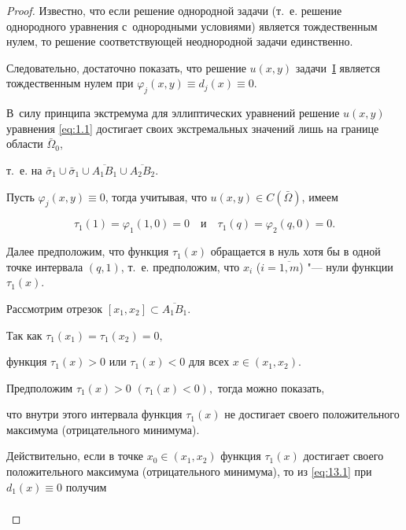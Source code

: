 \begin{proof}

Известно, что если решение однородной задачи  (т.~е. решение однородного уравнения с~однородными условиями) является тождественным нулем, то решение соответствующей неоднородной задачи единственно.   

Следовательно, достаточно показать, что решение $u(x,y)$ задачи~\hyperlink{abd:taskI}{\rm I}   является тождественным нулем при ${\varphi _j}(x, y) \equiv {d_j}(x) \equiv 0$.



В~силу принципа экстремума для эллиптических уравнений решение $u(x,y)$ уравнения \eqref{eq:1.1} достигает своих экстремальных значений лишь на границе области ${\bar \Omega _0}$, 

т.~е. на ${\bar \sigma _1} \cup {\bar \sigma _1} \cup \overline {{A_1}{B_1}}  \cup \overline {{A_2}{B_2}} $.



 Пусть ${\varphi _j}(x,y) \equiv 0$, тогда учитывая, что $u(x,y) \in C(\bar \Omega )$,  имеем 

 $${\tau _1}(1) = {\varphi _1}(1, 0) =  0 \quad \text{и}\quad {\tau _1}(q) = {\varphi _2}(q, 0) = 0.$$ 

Далее предположим, что функция ${\tau _1}(x)$  обращается в нуль хотя бы в одной точке интервала $(q, 1)$, т.~е. предположим, что  ${x_i}$ ($i = \overline {1, m} $) "--- нули функции~${\tau _1}(x)$.



Рассмотрим отрезок $[ {x_1}, {x_2}] \subset \overline {{A_1}{B_1}}$. 

Так как ${\tau _1}({x_1}) = {\tau _1}( {x_2}) = 0,$ 

функция ${\tau _1}( x ) > 0$ или ${\tau _1}( x) < 0$ для всех $x \in ( x_1 , x_2)$. 



Предположим ${\tau _1}\left( x \right) > 0$ $\left( {{\tau _1}\left( x \right) < 0} \right),$ тогда можно показать, 

что внутри  этого интервала функция ${\tau _1}(x)$ не достигает своего положительного максимума (отрицательного минимума).

Действительно, если в точке ${x_0} \in ( x_1, x_2)$ функция ${\tau _1}(x)$ достигает своего положительного максимума (отрицательного минимума), то из \eqref{eq:13.1} при ${d_1}(x) \equiv 0$ получим

\begin{multline}


\end{multline}
\end{proof}
